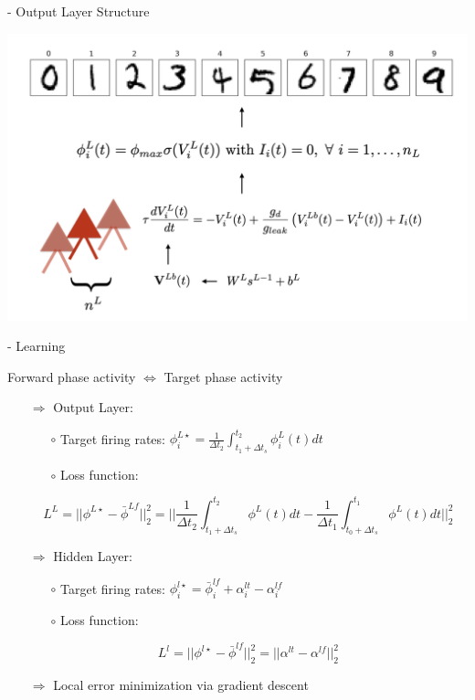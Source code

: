 \documentclass[dvipsnames, usenames]{beamer}
\begin{document}
\begin{frame}[noframenumbering]{\citet{guerguiev2017} - Output Layer Structure}

\centering 
\includegraphics[width=1.05\textwidth]{../figures/report/out_1}
\end{frame}


\begin{frame}[noframenumbering]{\citet{guerguiev2017} - Learning}
	\vspace{0.5cm}
	\begin{tcolorbox}
	Forward phase activity $\Leftrightarrow$ Target phase activity  
	\end{tcolorbox}

\begin{itemize}
	\item[$\Rightarrow$] Output Layer:
	\begin{itemize}
		\item[$\circ$] Target firing rates: $\phi_i^{L\star} = \frac{1}{\Delta t_2} \int_{t_1 + \Delta t_s}^{t_2} \phi_i^L(t)dt$
		\item[$\circ$] Loss function: 
	\end{itemize}
	\vspace{0.5cm}
	$$L^L = ||\phi^{L\star} - \bar{\phi}^{Lf}||_2^2 = ||\frac{1}{\Delta t_2} \int_{t_1 + \Delta t_s}^{t_2} \phi^L(t)dt - \frac{1}{\Delta t_1} \int_{t_0 + \Delta t_s}^{t_1} \phi^L(t)dt||_2^2$$
	\item[$\Rightarrow$] Hidden Layer:
	\begin{itemize}
		\item[$\circ$] Target firing rates: $\phi_i^{l\star} = \bar{\phi}_i^{lf} + \alpha_i^{lt} - \alpha_i^{lf}$
		\item[$\circ$] Loss function:
	\end{itemize}
	\vspace{0.5cm}
	$$L^l = ||\phi^{l\star} - \bar{\phi}^{lf}||_2^2 = ||\alpha^{lt} - \alpha^{lf}||_2^2$$
	\item[$\Rightarrow$] Local error minimization via gradient descent
\end{itemize}
\end{frame}
\end{document}
